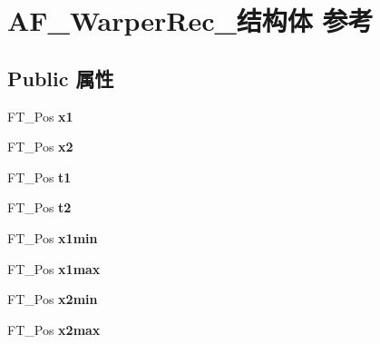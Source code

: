 \hypertarget{struct_a_f___warper_rec__}{}\section{A\+F\+\_\+\+Warper\+Rec\+\_\+结构体 参考}
\label{struct_a_f___warper_rec__}
\subsection*{Public 属性}
\begin{DoxyCompactItemize}
\item 
\mbox{\label{struct_a_f___warper_rec___a1d6504ad69987429482b51dd0f15263d}} 
F\+T\+\_\+\+Pos {\bfseries x1}
\item 
\mbox{\label{struct_a_f___warper_rec___ad8645166b145a3ec53e814c5e30837df}} 
F\+T\+\_\+\+Pos {\bfseries x2}
\item 
\mbox{\label{struct_a_f___warper_rec___a8d5476e3dc13752964d5de2927bc2808}} 
F\+T\+\_\+\+Pos {\bfseries t1}
\item 
\mbox{\label{struct_a_f___warper_rec___abd303e10d379e1551d70a94bf2f778a2}} 
F\+T\+\_\+\+Pos {\bfseries t2}
\item 
\mbox{\label{struct_a_f___warper_rec___a32c1bb0ea7f34abca5122fd49ae657cb}} 
F\+T\+\_\+\+Pos {\bfseries x1min}
\item 
\mbox{\label{struct_a_f___warper_rec___a010070e34e7e87d31d71e546041cf691}} 
F\+T\+\_\+\+Pos {\bfseries x1max}
\item 
\mbox{\label{struct_a_f___warper_rec___ab701d8e9dc461f6a8fbc994c44d82448}} 
F\+T\+\_\+\+Pos {\bfseries x2min}
\item 
\mbox{\label{struct_a_f___warper_rec___a596c2b87d56a1673c6b7c165475bac32}} 
F\+T\+\_\+\+Pos {\bfseries x2max}
\item 
\mbox{\label{struct_a_f___warper_rec___a0c083dddb698c6a928f74d4f5ace07b0}} 

\end{DoxyCompactItemize}
